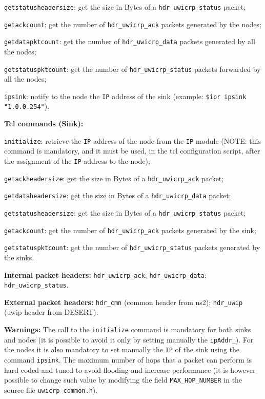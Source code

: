 \begin{description}
\begin{description}
    \item {\tt getstatusheadersize}: get the size in Bytes of a {\tt hdr\_uwicrp\_status} packet;
    \item {\tt getackcount}: get the number of {\tt hdr\_uwicrp\_ack} packets generated by the nodes;
    \item {\tt getdatapktcount}: get the number of {\tt hdr\_uwicrp\_data} packets generated by all the nodes;
    \item {\tt getstatuspktcount}: get the number of {\tt hdr\_uwicrp\_status} packets forwarded by all the nodes;
    \item {\tt ipsink}: notify to the node the {\tt IP} address of the sink (example: {\tt \$ipr ipsink "1.0.0.254"}).
   \end{description}
   \item {\bf Tcl commands (Sink):}
   \begin{description}
    \item {\tt initialize}: retrieve the {\tt IP} address of the node from the {\tt IP} module (NOTE: this command is mandatory, and it must be used, in the tcl configuration script, after the assignment of the {\tt IP} address to the node);
    \item {\tt getackheadersize}: get the size in Bytes of a {\tt hdr\_uwicrp\_ack} packet;
    \item {\tt getdataheadersize}: get the size in Bytes of a {\tt hdr\_uwicrp\_data} packet;
    \item {\tt getstatusheadersize}: get the size in Bytes of a {\tt hdr\_uwicrp\_status} packet;
    \item {\tt getackcount}: get the number of {\tt hdr\_uwicrp\_ack} packets generated by the sink;
    \item {\tt getstatuspktcount}: get the number of {\tt hdr\_uwicrp\_status} packets generated by the sinks.
   \end{description}
   \item {\bf Internal packet headers:} {\tt hdr\_uwicrp\_ack}; {\tt hdr\_uwicrp\_data}; \\ {\tt hdr\_uwicrp\_status}.
   \item {\bf External packet headers:} {\tt hdr\_cmn} (common header from ns2); {\tt hdr\_uwip} (uwip header from DESERT).
   \item {\bf Warnings:} The call to the {\tt initialize} command is mandatory for both sinks and nodes (it is possible to avoid it only by setting manually the {\tt ipAddr\_}). For the nodes it is also mandatory to set manually the {\tt IP} of the sink using the command {\tt ipsink}. The maximum number of hops that a packet can perform is hard-coded and tuned to avoid flooding and increase performance (it is however possible to change such value by modifying the field {\tt MAX\_HOP\_NUMBER} in the source file {\tt uwicrp-common.h}).

\end{description}
